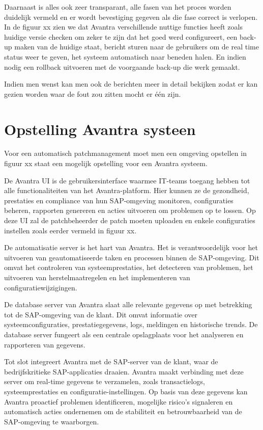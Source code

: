 \documentclass[dutch,dit,thesis]{hogentreport}
\begin{document}
Daarnaast is alles ook zeer transparant, alle fasen van het proces worden duidelijk vermeld en er wordt bevestiging gegeven als die fase correct is verlopen. In de figuur xx zien we dat Avantra verschillende
nuttige functies heeft zoals huidige versie checken om zeker te zijn dat het goed werd configureert, een back-up maken van de huidige staat, bericht sturen naar de gebruikers om de real time status weer
   te geven, het systeem automatisch naar beneden halen. En indien nodig een rollback uitvoeren met de voorgaande back-up die werk gemaakt.


Indien men wenst kan men ook de berichten meer in detail bekijken zodat er kan gezien worden waar de fout zou zitten mocht er één zijn.


\section{Opstelling Avantra systeen}
Voor een automatisch patchmanagement moet men een omgeving opstellen in figuur xx staat een mogelijk opstelling voor een Avantra systeem. 





De Avantra UI is de gebruikersinterface waarmee IT-teams toegang hebben tot alle functionaliteiten van het Avantra-platform. Hier kunnen ze de gezondheid, prestaties en compliance van hun SAP-omgeving 
monitoren, configuraties beheren, rapporten genereren en acties uitvoeren om problemen op te lossen. Op deze UI zal de patchbeheerder de patch moeten uploaden en enkele configuraties instellen zoals eerder vermeld in figuur xx.

De automatisatie server is het hart van Avantra. Het is verantwoordelijk voor het uitvoeren van geautomatiseerde taken en processen binnen de SAP-omgeving. Dit omvat het controleren van systeemprestaties, het detecteren
 van problemen, het uitvoeren van herstelmaatregelen en het implementeren van configuratiewijzigingen.

De database server van Avantra slaat alle relevante gegevens op met betrekking tot de SAP-omgeving van de klant. Dit omvat informatie over systeemconfiguraties, prestatiegegevens, logs, meldingen en historische
 trends. De database server fungeert als een centrale opslagplaats voor het analyseren en rapporteren van gegevens.

Tot slot integreert Avantra met de SAP-server van de klant, waar de bedrijfskritieke SAP-applicaties draaien. Avantra maakt verbinding met deze server om real-time gegevens te verzamelen, zoals transactielogs, systeemprestaties
 en configuratie-instellingen. Op basis van deze gegevens kan Avantra proactief problemen identificeren, mogelijke risico's signaleren en automatisch acties ondernemen om de stabiliteit en betrouwbaarheid van de SAP-omgeving te waarborgen.
\end{document}
